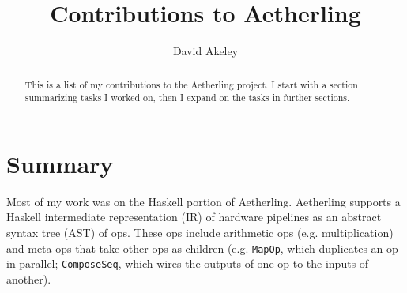 \documentclass[12pt]{article}
\begin{document}
\sloppy
\title{Contributions to Aetherling}
\author{David Akeley}
\maketitle

\begin{abstract}
This is a list of my contributions to the Aetherling project. I start
with a section summarizing tasks I worked on, then I expand on the
tasks in further sections.
\end{abstract}

\section{Summary}

Most of my work was on the Haskell portion of Aetherling.
Aetherling supports a Haskell intermediate representation (IR) of
hardware pipelines as an abstract syntax tree (AST) of ops.  These ops
include arithmetic ops (e.g. multiplication) and meta-ops that take
other ops as children (e.g. \texttt{MapOp}, which duplicates an op in
parallel; \texttt{ComposeSeq}, which wires the outputs of one op to
the inputs of another).
\end{document}
